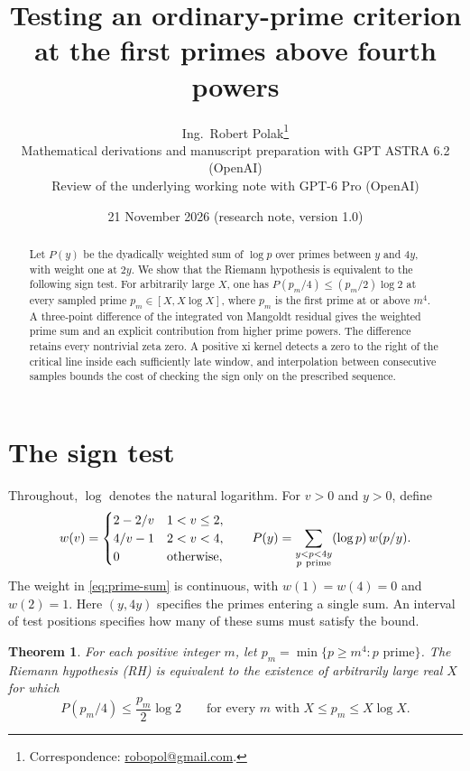 \documentclass[11pt,a4paper]{article}
\title{Testing an ordinary-prime criterion\\at the first primes above fourth powers}
\author{Ing.\ Robert Polak\thanks{Correspondence:
\href{mailto:robopol@gmail.com}{robopol@gmail.com}.}\\[0.4em]
\small Mathematical derivations and manuscript preparation with GPT ASTRA 6.2 (OpenAI)\\
\small Review of the underlying working note with GPT-6 Pro (OpenAI)}
\date{21 November 2026 \quad (research note, version 1.0)}
\newtheorem{theorem}{Theorem}[section]
\begin{document}
\maketitle
\begin{abstract}
Let \(P(y)\) be the dyadically weighted sum of \(\log p\) over primes
between \(y\) and \(4y\), with weight one at \(2y\). We show that the
Riemann hypothesis is equivalent to the following sign test.
For arbitrarily large \(X\), one has \(P(p_m/4)\le (p_m/2)\log 2\)
at every sampled prime \(p_m\in[X,X\log X]\), where \(p_m\) is the
first prime at or above \(m^4\). A three-point difference of the
integrated von Mangoldt residual gives the weighted prime sum and an
explicit contribution from higher prime powers. The difference retains
every nontrivial zeta zero. A positive xi kernel detects a zero to
the right of the critical line inside each sufficiently late window,
and interpolation between consecutive samples bounds the cost of
checking the sign only on the prescribed sequence.
\end{abstract}

\section{The sign test}

Throughout, \(\log\) denotes the natural logarithm. For \(v>0\) and
\(y>0\), define
\begin{equation}\label{eq:prime-sum}
 w(v)=
 \begin{cases}
  2-2/v&1<v\le2,\\
  4/v-1&2<v<4,\\
  0&\text{otherwise},
 \end{cases}
 \qquad
 P(y)=\sum_{\substack{y<p<4y\\ p\ {\rm prime}}}(\log p)\,w(p/y).
\end{equation}
The weight in \eqref{eq:prime-sum} is continuous, with \(w(1)=w(4)=0\) and \(w(2)=1\).
Here \((y,4y)\) specifies the primes entering a single sum. An interval
of test positions specifies how many of these sums must satisfy the bound.

\begin{theorem}\label{thm:samples}
For each positive integer \(m\), let \(p_m=\min\{p\ge m^4:p\text{ prime}\}\).
The Riemann hypothesis (RH) is equivalent to the existence of arbitrarily
large real \(X\) for which
\begin{equation}\label{eq:sample-sign}
 P(p_m/4)\le \frac{p_m}{2}\log 2
 \qquad\text{for every }m\text{ with }X\le p_m\le X\log X .
\end{equation}
\end{theorem}
\end{document}
